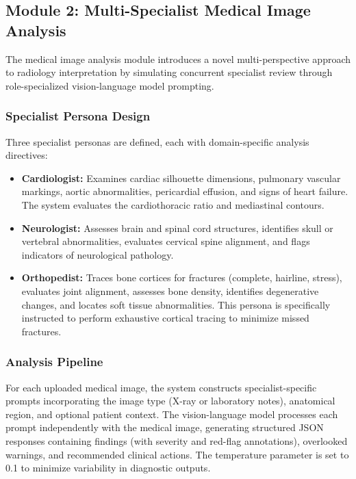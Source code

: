 \documentclass[conference]{IEEEtran}
\begin{document}
\subsection{Module 2: Multi-Specialist Medical Image Analysis}

The medical image analysis module introduces a novel multi-perspective approach to radiology interpretation by simulating concurrent specialist review through role-specialized vision-language model prompting.

\subsubsection{Specialist Persona Design}
Three specialist personas are defined, each with domain-specific analysis directives:

\begin{itemize}
    \item \textbf{Cardiologist:} Examines cardiac silhouette dimensions, pulmonary vascular markings, aortic abnormalities, pericardial effusion, and signs of heart failure. The system evaluates the cardiothoracic ratio and mediastinal contours.
    \item \textbf{Neurologist:} Assesses brain and spinal cord structures, identifies skull or vertebral abnormalities, evaluates cervical spine alignment, and flags indicators of neurological pathology.
    \item \textbf{Orthopedist:} Traces bone cortices for fractures (complete, hairline, stress), evaluates joint alignment, assesses bone density, identifies degenerative changes, and locates soft tissue abnormalities. This persona is specifically instructed to perform exhaustive cortical tracing to minimize missed fractures.
\end{itemize}

\subsubsection{Analysis Pipeline}
For each uploaded medical image, the system constructs specialist-specific prompts incorporating the image type (X-ray or laboratory notes), anatomical region, and optional patient context. The vision-language model processes each prompt independently with the medical image, generating structured JSON responses containing findings (with severity and red-flag annotations), overlooked warnings, and recommended clinical actions. The temperature parameter is set to 0.1 to minimize variability in diagnostic outputs.
\end{document}
